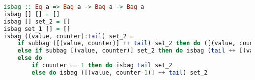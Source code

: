 \begin{lstlisting}[language=haskell]
isbag :: Eq a => Bag a -> Bag a -> Bag a
isbag [] [] = []
isbag [] set_2 = []
isbag set_1 [] = []
isbag ((value, counter):tail) set_2 =
    if subbag ([(value, counter)] ++ tail) set_2 then do ([(value, counter)] ++ tail) 
    else if subbag [(value, counter)] set_2 then do isbag (tail ++ [(value, counter)]) ((del value set_2) ++ [(value, counter)])
    else do 
        if counter == 1 then do isbag tail set_2
        else do isbag ([(value, counter-1)] ++ tail) set_2
\end{lstlisting}